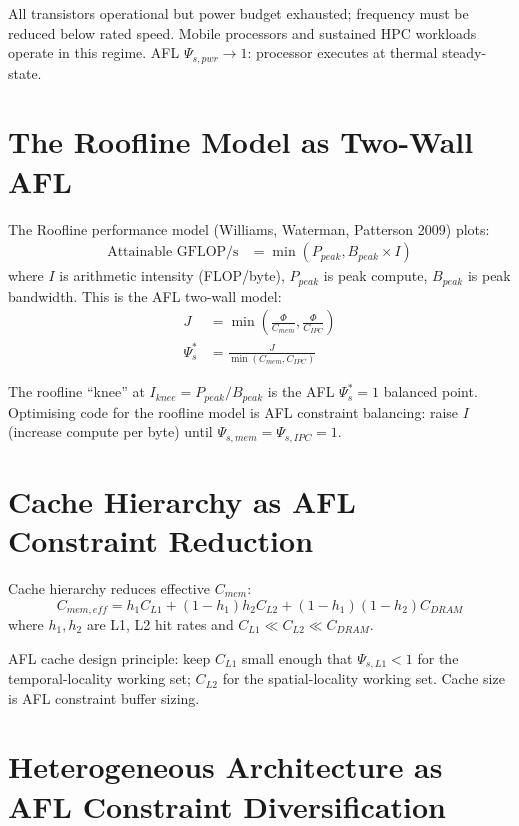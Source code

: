 \documentclass[11pt]{article}
\begin{document}
All transistors operational but power budget exhausted; frequency must be reduced below rated
speed. Mobile processors and sustained HPC workloads operate in this regime. AFL $\Psi_{s,pwr}
\to 1$: processor executes at thermal steady-state.

\section{The Roofline Model as Two-Wall AFL}

The Roofline performance model (Williams, Waterman, Patterson 2009) plots:
\begin{align}
\text{Attainable GFLOP/s} &= \min(P_{peak}, B_{peak} \times I)
\end{align}
where $I$ is arithmetic intensity (FLOP/byte), $P_{peak}$ is peak compute, $B_{peak}$ is
peak bandwidth. This is the AFL two-wall model:
\begin{align}
J &= \min\left(\frac{\Phi}{C_{mem}}, \frac{\Phi}{C_{IPC}}\right)\\
\Psi_s^* &= \frac{J}{\min(C_{mem}, C_{IPC})}
\end{align}

The roofline ``knee'' at $I_{knee} = P_{peak}/B_{peak}$ is the AFL $\Psi_s^* = 1$ balanced point.
Optimising code for the roofline model is AFL constraint balancing: raise $I$ (increase
compute per byte) until $\Psi_{s,mem} = \Psi_{s,IPC} = 1$.

\section{Cache Hierarchy as AFL Constraint Reduction}

Cache hierarchy reduces effective $C_{mem}$:
\begin{equation}
C_{mem,eff} = h_1 C_{L1} + (1-h_1)h_2 C_{L2} + (1-h_1)(1-h_2)C_{DRAM}
\end{equation}
where $h_1, h_2$ are L1, L2 hit rates and $C_{L1} \ll C_{L2} \ll C_{DRAM}$.

AFL cache design principle: keep $C_{L1}$ small enough that $\Psi_{s,L1} < 1$ for the
temporal-locality working set; $C_{L2}$ for the spatial-locality working set. Cache size
is AFL constraint buffer sizing.

\section{Heterogeneous Architecture as AFL Constraint Diversification}
\end{document}
